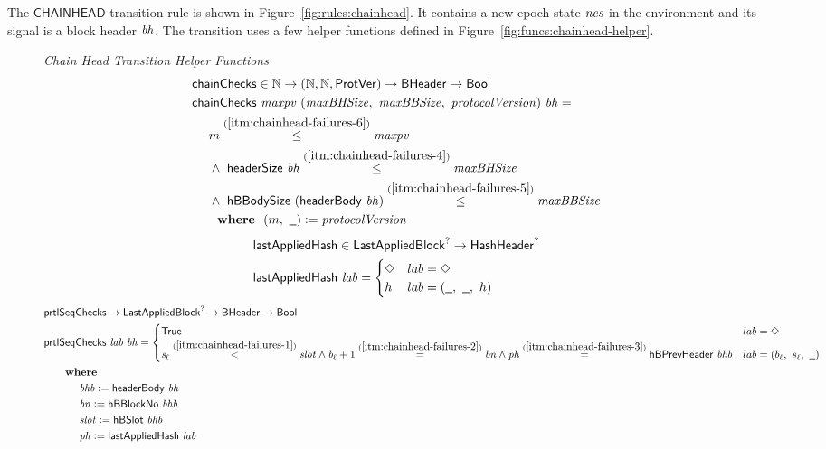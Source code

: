 The $\mathsf{CHAINHEAD}$ transition rule is shown in Figure~\ref{fig:rules:chainhead}.
It contains a new epoch state $\mathit{nes}$ in the environment and its signal is a block
header $\mathit{bh}$.
The transition uses a few helper functions defined in Figure~\ref{fig:funcs:chainhead-helper}.

\begin{figure}[htb]
  \emph{Chain Head Transition Helper Functions}
  \begin{align*}
      & \fun{chainChecks} \in \N \to (\N,\N, \ProtVer) \to \BHeader \to \Bool \\
      & \fun{chainChecks}~\var{maxpv}~(\var{maxBHSize},~\var{maxBBSize},~\var{protocolVersion})~\var{bh} = \\
      & ~~~~ m \overset{(\ref{itm:chainhead-failures-6})}{\leq} \var{maxpv} \\
      & ~~~~ \land~\headerSize{bh} \overset{(\ref{itm:chainhead-failures-4})}{\leq} \var{maxBHSize} \\
      & ~~~~ \land~\hBBodySize{(\headerBody{bh})} \overset{(\ref{itm:chainhead-failures-5})}{\leq} \var{maxBBSize} \\
      & ~~~~ \where (m,~\wcard)\leteq\var{protocolVersion}
  \end{align*}
  \begin{align*}
      & \fun{lastAppliedHash} \in \LastAppliedBlock^? \to \HashHeader^? \\
      & \fun{lastAppliedHash}~\var{lab} =
        \begin{cases}
          \Nothing & lab = \Nothing \\
          h & lab = (\wcard,~\wcard,~h) \\
        \end{cases}
  \end{align*}
  \begin{align*}
      & \fun{prtlSeqChecks} \to \LastAppliedBlock^? \to \BHeader \to \Bool \\
      & \fun{prtlSeqChecks}~\var{lab}~\var{bh} =
        \begin{cases}
          \mathsf{True}
          &
          lab = \Nothing
          \\
          \var{s_\ell} \overset{(\ref{itm:chainhead-failures-1})}{<} \var{slot}
          \land \var{b_\ell} + 1 \overset{(\ref{itm:chainhead-failures-2})}{=} \var{bn}
          \land \var{ph} \overset{(\ref{itm:chainhead-failures-3})}{=} \hBPrevHeader{bhb}
          &
          lab = (b_\ell,~s_\ell,~\wcard) \\
        \end{cases} \\
      & ~~~~\where \\
      & ~~~~~~~~~~\var{bhb} \leteq \headerBody{bh} \\
      & ~~~~~~~~~~\var{bn} \leteq \hBBlockNo{bhb} \\
      & ~~~~~~~~~~\var{slot} \leteq \hBSlot{bhb} \\
      & ~~~~~~~~~~\var{ph} \leteq \lastAppliedHash{lab} \\
  \end{align*}


\end{figure}
